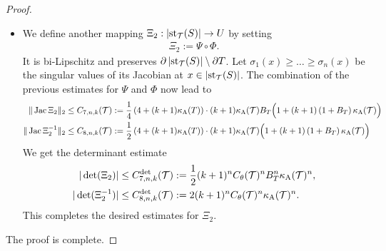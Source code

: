 \documentclass[10pt,a4paper]{article}
\begin{document}
\begin{proof}
\begin{itemize}
        
        \item 
        We define another mapping $ \Xi_{2} : \left| \operatorname{st}_{{\mathcal T}}(S) \right| \rightarrow U $ by setting 
        \begin{align*}
            \Xi_{2} := \Psi \circ \Phi.
        \end{align*}
        It is bi-Lipschitz and preserves $\partial\left| \operatorname{st}_{{\mathcal T}}(S) \right| \setminus \partial T$. 
		Let $\sigma_1(x) \geq \dots \geq \sigma_n(x)$ be the singular values of its Jacobian at $x \in \left| \operatorname{st}_{{\mathcal T}}(S) \right|$. 
        The combination of the previous estimates for $\Psi$ and $\Phi$ now lead to 
        \begin{align*}
            \|  \operatorname{{\rm Jac}} \Xi_{2}  \|_{2}
            &\leq 
            C_{7,n,k}({\mathcal T})
            :=
            \frac 1 4
            \left( 4 + (k+1) \kappa_{\rm A}(T) \right)
            \cdot 
            (k+1) 
            \kappa_{\rm A}({\mathcal T})
            B_{T}
            \Big( 
                1 
                + 
                (k+1) 
                \left( 1 + B_{T} \right)
                \kappa_{\rm A}({\mathcal T})
            \Big)            
            \\
            \|  \operatorname{{\rm Jac}} \Xi_{2}^{-1}  \|_{2}
            &\leq  
            C_{8,n,k}({\mathcal T})
            :=
            \frac 1 2
            \left( 4 + (k+1) \kappa_{\rm A}(T) \right)
            \cdot 
            (k+1) 
            \kappa_{\rm A}({\mathcal T})
            \Big( 
                1 
                + 
                (k+1) 
                \left( 1 + B_{T} \right)
                \kappa_{\rm A}({\mathcal T})
            \Big)            
        \end{align*}
        We get the determinant estimate 
        \begin{align*}
            |\det(\Xi_{2})|
            &\leq 
            C^{\det}_{7,n,k}({\mathcal T})
            :=
            \frac 1 2 
            (k+1)^{n}
            C_\theta({\mathcal T})^{n}
            B_{T}^{n}
            \kappa_{\rm A}({\mathcal T})^{n}
            ,
            \\
            |\det(\Xi_{2}^{-1})|
            &\leq 
            C^{\det}_{8,n,k}({\mathcal T})
            :=
            2
            (k+1)^{n}
            C_\theta({\mathcal T})^{n}
            \kappa_{\rm A}({\mathcal T})^{n}
            .
        \end{align*}
        This completes the desired estimates for $\Xi_{2}$. 
    \end{itemize}
    The proof is complete. 
\end{proof}
        
\end{document}
